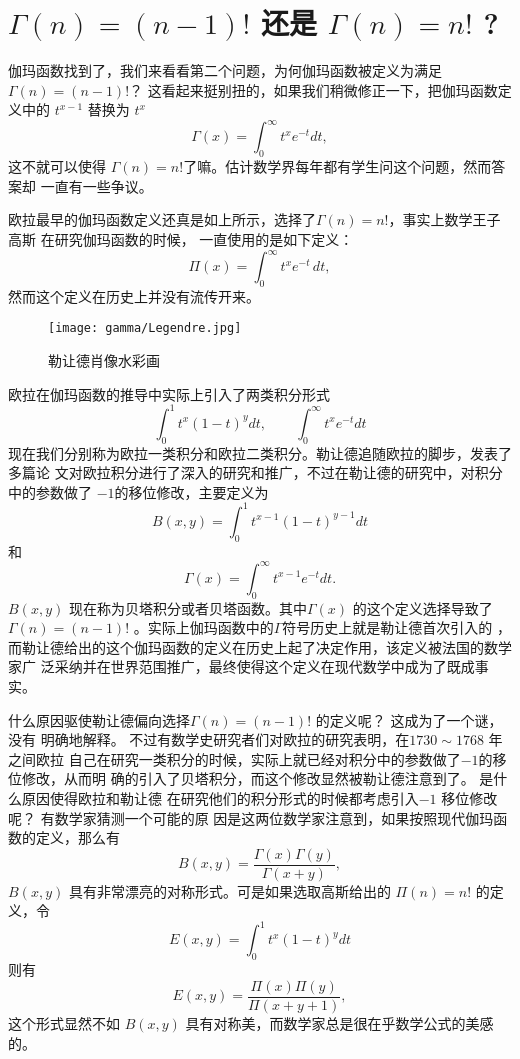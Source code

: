 \section{$ \Gamma(n) = (n-1)!$ 还是  $ \Gamma(n) = n! $ ? }

伽玛函数找到了，我们来看看第二个问题，为何伽玛函数被定义为满足
$\Gamma(n)=(n-1)!$？ 这看起来挺别扭的，如果我们稍微修正一下，把伽玛函数定义中的
$t^{x-1}$ 替换为
$t^x$
$$ \Gamma(x) = \int_0^{\infty} t^{x}e^{-t}dt , $$
这不就可以使得 $\Gamma(n)=n!$了嘛。估计数学界每年都有学生问这个问题，然而答案却
一直有一些争议。  

欧拉最早的伽玛函数定义还真是如上所示，选择了$\Gamma(n)=n!$，事实上数学王子高斯
在研究伽玛函数的时候， 一直使用的是如下定义： 
$$ \Pi(x)=\int_{0}^\infty t^x e^{-t}\,dt ,$$ 
然而这个定义在历史上并没有流传开来。 

\begin{figure}[htbp]
\centering
\texttt{[image: gamma/Legendre.jpg]}
\caption{勒让德肖像水彩画}
\end{figure}

欧拉在伽玛函数的推导中实际上引入了两类积分形式
$$ \int_0^1 t^{x}(1-t)^{y}dt, \quad  \quad \int_0^{\infty} t^{x}e^{-t}dt $$
现在我们分别称为欧拉一类积分和欧拉二类积分。勒让德追随欧拉的脚步，发表了多篇论
文对欧拉积分进行了深入的研究和推广，不过在勒让德的研究中，对积分中的参数做了
$-1$的移位修改，主要定义为
$$ B(x, y) = \int_0^1 t^{x-1}(1-t)^{y-1}dt $$
和
$$ \Gamma(x) = \int_0^{\infty} t^{x-1}e^{-t}dt .$$
$B(x,y)$ 现在称为贝塔积分或者贝塔函数。其中$\Gamma(x)$ 的这个定义选择导致了 $
\Gamma(n) = (n-1)!$ 。实际上伽玛函数中的$\Gamma$符号历史上就是勒让德首次引入的
，而勒让德给出的这个伽玛函数的定义在历史上起了决定作用，该定义被法国的数学家广
泛采纳并在世界范围推广，最终使得这个定义在现代数学中成为了既成事实。

什么原因驱使勒让德偏向选择$\Gamma(n) = (n-1)!$ 的定义呢？ 这成为了一个谜，没有
明确地解释。 不过有数学史研究者们对欧拉的研究表明，在$1730\sim1768$ 年之间欧拉
自己在研究一类积分的时候，实际上就已经对积分中的参数做了$-1$的移位修改，从而明
确的引入了贝塔积分，而这个修改显然被勒让德注意到了。 是什么原因使得欧拉和勒让德
在研究他们的积分形式的时候都考虑引入$-1$ 移位修改呢？ 有数学家猜测一个可能的原
因是这两位数学家注意到，如果按照现代伽玛函数的定义，那么有
\begin{equation}
\label{beta-gamma-decompose}
 B(x,y) = \frac{\Gamma(x)\Gamma(y)}{\Gamma(x+y)} ,
\end{equation}
$B(x,y)$ 具有非常漂亮的对称形式。可是如果选取高斯给出的 $\Pi(n)=n!$ 的定义，令
$$ E(x, y) = \int_0^1 t^{x}(1-t)^{y}dt $$
则有
$$ E(x,y) = \frac{\Pi(x)\Pi(y)}{\Pi(x+y+1)} ,$$
这个形式显然不如 $B(x,y)$ 具有对称美，而数学家总是很在乎数学公式的美感的。

